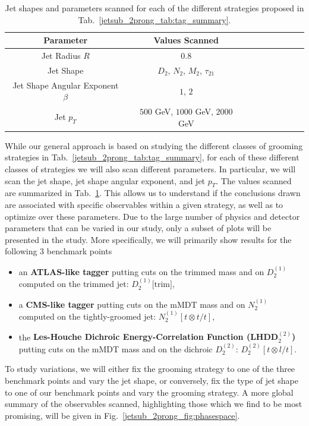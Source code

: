 \documentclass[11pt]{cernrep}
\begin{document}
\begin{table}
\begin{center}
\begin{tabular}{| c | c | c |c |c|c|c |c|r| }
  \hline                       
  Parameter &  Values Scanned \\
  \hline
  Jet Radius $R$ &   $0.8$ \\
  Jet Shape  &   $D_2$, $N_2$, $M_2$, $\tau_{21}$  \\
  Jet Shape Angular Exponent $\beta$ &   $1$, $2$ \\
  Jet $p_T$ &   $500$ GeV, $1000$ GeV, $2000$ GeV  \\
  \hline  
\end{tabular}
\end{center}
\caption{
Jet shapes and parameters scanned for each of the different strategies proposed in Tab.~\ref{jetsub_2prong_tab:tag_summary}. 
}
\label{jetsub_2prong_tab:params}
\end{table}


While our general approach is based on studying the different classes of grooming strategies in Tab.~\ref{jetsub_2prong_tab:tag_summary}, for each of these different classes of strategies we will also scan different parameters.
%
In particular, we will scan the jet shape, jet shape angular exponent, and jet $p_T$.
%
The values scanned are summarized in Tab.~\ref{jetsub_2prong_tab:params}.
%
This allows us to understand if the conclusions drawn are associated with specific observables within a given strategy, as well as to optimize over these parameters.
%
Due to the large number of physics and detector parameters that can be
varied in our study, only a subset of plots will be presented in the
study. More specifically, we will primarily show results for the
following 3 benchmark points
%
\begin{itemize}
%
\item an {\bf ATLAS-like tagger} putting cuts on the trimmed mass and
on $D_2^{(1)}$ computed on the trimmed jet: $D_2^{(1)}\text{[trim]}$,
%
\item a {\bf CMS-like tagger} putting cuts on the mMDT mass and on
$N_2^{(1)}$ computed on the tightly-groomed jet: $N_2^{(1)}[t\otimes t/t]$,
%
\item the {\bf Les-Houche Dichroic Energy-Correlation Function
(LHDD$_2^{(2)}$)} putting cuts on the mMDT mass and on the dichroic
$D_2^{(2)}$: $D_2^{(2)}[t\otimes l/t]$.
%
\end{itemize}
%
To study variations, we will either fix the grooming strategy to one
of the three benchmark points and vary the jet shape, or conversely,
fix the type of jet shape to one of our benchmark points and vary the
grooming strategy.
%
A more global summary of the observables scanned, highlighting those
which we find to be most promising, will be given in
Fig.~\ref{jetsub_2prong_fig:phasespace}.
\end{document}
